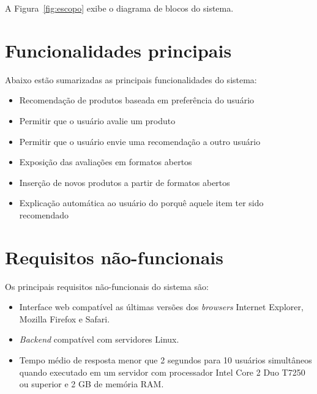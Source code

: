 A Figura~\ref{fig:escopo} exibe o diagrama de blocos do sistema.


\section{Funcionalidades principais} %
\label{sec:funcionalidades_principais}

Abaixo estão sumarizadas as principais funcionalidades do sistema:

\begin{itemize}

	\item Recomendação de produtos baseada em preferência do usuário

	\item Permitir que o usuário avalie um produto

	\item Permitir que o usuário envie uma recomendação a outro usuário

	\item Exposição das avaliações em formatos abertos

    \item Inserção de novos produtos a partir de formatos abertos

    \item Explicação automática ao usuário do porquê aquele item ter sido recomendado
	
\end{itemize}

\section{Requisitos não-funcionais}

Os principais requisitos não-funcionais do sistema são:

\begin{itemize}

    \item Interface web compatível as últimas versões dos \textit{browsers} Internet Explorer, Mozilla Firefox e Safari.
    
    \item \textit{Backend} compatível com servidores Linux.

    \item Tempo médio de resposta menor que 2 segundos para 10 usuários simultâneos quando executado em um servidor com processador Intel Core 2 Duo T7250 ou superior e 2 GB de memória RAM. %

\end{itemize}

